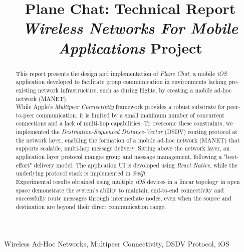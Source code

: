 \documentclass[conference]{IEEEtran}
\begin{document}
\title{Plane Chat: Technical Report\\
{\footnotesize \textit{Wireless Networks For Mobile Applications} Project}
}

\author{
}

\maketitle

\begin{abstract}
This report presents the design and implementation of \textit{Plane Chat}, a
mobile \textit{iOS} application developed to facilitate group communication in
environments lacking pre-existing network infrastructure, such as during
flights, by creating a mobile ad-hoc network (MANET). \\
While Apple's \textit{Multipeer Connectivity} \cite {b2} framework 
provides a robust substrate for peer-to-peer communication, it is limited by a
small maximum number of concurrent connections and a lack of multi-hop
capabilities. To overcome these constraints, we implemented the
\textit{Destination-Sequenced Distance-Vector} (DSDV) routing protocol \cite{b1}
at the network layer, enabling the formation of a mobile ad-hoc network (MANET)
that supports scalable, multi-hop message delivery. Sitting above the network
layer, an application layer protocol manges group and message management,
following a "best-effort" delivery model. The application UI is
devoloped using \textit{React Native}, while the underlying protocol stack is
implemented in \textit{Swift}. \\
Experimental results obtained using multiple \textit{iOS} devices in a linear
topology in open space demonstrate the system's ability to maintain end-to-end
connectivity and successfully route messages through intermediate nodes, even
when the source and destination are beyond their direct communication range. 
\end{abstract}

\begin{IEEEkeywords}
Wireless Ad-Hoc Networks, Multipeer Connectivity, DSDV Protocol, iOS
\end{IEEEkeywords}
\end{document}
